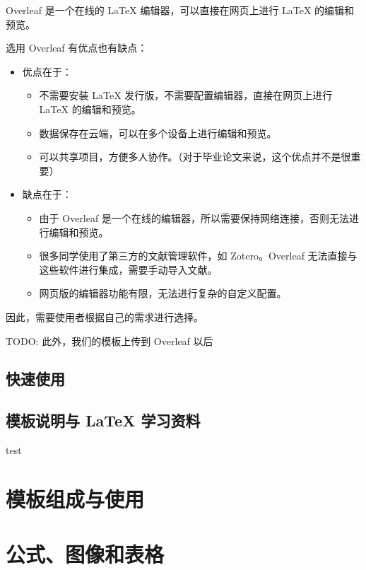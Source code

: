 Overleaf 是一个在线的 \LaTeX{} 编辑器，可以直接在网页上进行 \LaTeX{} 的编辑和预览。

选用 Overleaf 有优点也有缺点：
\begin{itemize}
  \item 优点在于：
    \begin{itemize}
      \item 不需要安装 \LaTeX{} 发行版，不需要配置编辑器，直接在网页上进行 \LaTeX{} 的编辑和预览。
      \item 数据保存在云端，可以在多个设备上进行编辑和预览。
      \item 可以共享项目，方便多人协作。（对于毕业论文来说，这个优点并不是很重要）
    \end{itemize}
  \item 缺点在于：
    \begin{itemize}
      \item 由于 Overleaf 是一个在线的编辑器，所以需要保持网络连接，否则无法进行编辑和预览。
      \item 很多同学使用了第三方的文献管理软件，如 Zotero。Overleaf 无法直接与这些软件进行集成，需要手动导入文献。
      \item 网页版的编辑器功能有限，无法进行复杂的自定义配置。
    \end{itemize}
\end{itemize}

因此，需要使用者根据自己的需求进行选择。

TODO:
此外，我们的模板上传到 Overleaf 以后

\section{快速使用}

\section{模板说明与 LaTeX 学习资料}

test

\chapter{模板组成与使用}

\chapter{公式、图像和表格}

